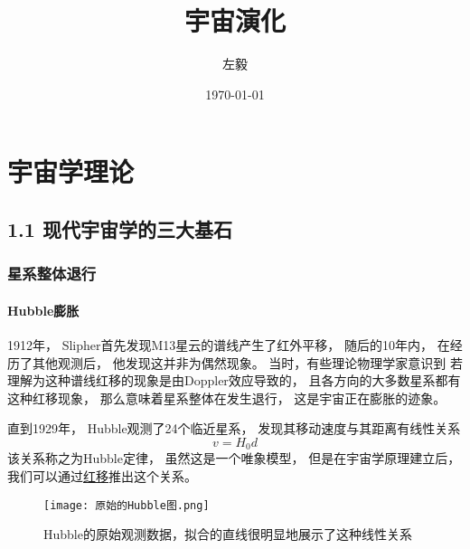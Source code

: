 \documentclass[8pt]{beamer}
\begin{document}
    \title[宇宙演化]{宇宙演化}
    \author[左毅]{左毅} 
    \date{\today}  
\begin{frame}
    \titlepage
\end{frame}

\section[目录]{}
    \frame {
        \frametitle{\secname}
        \tableofcontents
    }



\section{宇宙学理论}
    \subsection{1.1 现代宇宙学的三大基石}
        \begin{frame}[fragile]
            \frametitle{星系整体退行}
            \framesubtitle{Hubble膨胀}
            \begin{multicols}{2}
                \qquad
                1912年，
                Slipher首先发现M13星云的谱线产生了红外平移，
                随后的10年内，
                在经历了其他观测后，
                他发现这并非为偶然现象。
                当时，有些理论物理学家意识到
                若理解为这种谱线红移的现象是由Doppler效应导致的，
                且各方向的大多数星系都有这种红移现象，
                那么意味着星系整体在发生退行，
                这是宇宙正在膨胀的迹象。

                \qquad
                直到1929年，
                Hubble观测了24个临近星系，
                发现其移动速度与其距离有线性关系
                $$v=H_0d$$
                \qquad
                该关系称之为Hubble定律，
                虽然这是一个唯象模型，
                但是在宇宙学原理建立后，
                我们可以通过\hyperlink{附录1}{\underline{红移}}推出这个关系。
                \begin{figure}[h]
                    \centering  
                    \texttt{[image: 原始的Hubble图.png]}  
                    \caption{Hubble的原始观测数据，拟合的直线很明显地展示了这种线性关系}  
                \end{figure}
                
            \end{multicols}
        \end{frame}
\end{document}
